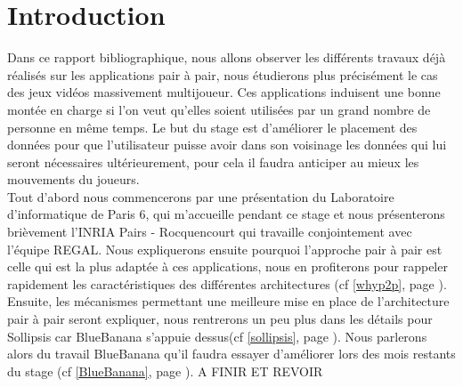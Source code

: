 \section{Introduction}
	Dans ce rapport bibliographique, nous allons observer les différents travaux déjà réalisés sur les applications pair à pair, nous étudierons plus précisément le cas des jeux vidéos massivement multijoueur. Ces applications induisent une bonne montée en charge si l'on veut qu'elles soient utilisées par un grand nombre de personne en même temps. Le but du stage est d'améliorer le placement des données pour que l'utilisateur puisse avoir dans son voisinage les données qui lui seront nécessaires ultérieurement, pour cela il faudra anticiper au mieux les mouvements du joueurs.\\
	Tout d'abord nous commencerons par une présentation du Laboratoire d'informatique de Paris 6, qui m'accueille pendant ce stage et nous présenterons brièvement l'INRIA Pairs - Rocquencourt qui travaille conjointement avec l'équipe REGAL. Nous expliquerons ensuite pourquoi l'approche pair à pair est celle qui est la plus adaptée à ces applications, nous en profiterons pour rappeler rapidement les caractéristiques des différentes architectures (cf \ref{whyp2p}, page \pageref{whyp2p}). Ensuite, les mécanismes permettant une meilleure mise en place de l'architecture pair à pair seront expliquer, nous rentrerons un peu plus dans les détails pour Sollipsis car BlueBanana s'appuie dessus(cf \ref{sollipsis}, page \pageref{sollipsis}). Nous parlerons alors du travail BlueBanana qu'il faudra essayer d'améliorer lors des mois restants du stage (cf \ref{BlueBanana}, page \pageref{BlueBanana}). A FINIR ET REVOIR

